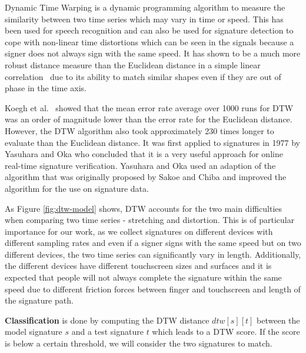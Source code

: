 \documentclass[a4paper, oneside]{csthesis}
\begin{document}
Dynamic Time Warping is a dynamic programming algorithm to measure the similarity between two time series which may vary in time or speed. This has been used for speech recognition and can also be used for signature detection to cope with  non-linear time distortions which can be seen in the signals because a signer does not always sign with the same speed. It has shown to be a much more robust distance measure than the Euclidean distance in a simple linear correlation~\cite{Keogh:2000:SUD:347090.347153, 1030918, 1227706} due to its ability to match similar shapes even if they are out of phase in the time axis.

Koegh et al.~\cite{Keogh:2002:EID:1287369.1287405} showed that the mean error rate average over 1000 runs for DTW was an order of magnitude lower than the error rate for the Euclidean distance. However, the DTW algorithm also took approximately 230 times longer to evaluate than the Euclidean distance.
It was first applied to signatures in 1977 by Yasuhara and Oka \cite{yasuhara1977DTW} who concluded that it is a very useful approach for online real-time signature verification. Yasuhara and Oka used an adaption of the algorithm that was originally proposed by Sakoe and Chiba \cite{1163055} and improved the algorithm for the use on signature data.

As Figure \ref{fig:dtw-model} shows, DTW accounts for the two main difficulties when comparing two time series - stretching and distortion. This is of particular importance for our work, as we collect signatures on different devices with different sampling rates and even if a signer signs with the same speed but on two different devices, the two time series can significantly vary in length. Additionally, the different devices have different touchscreen sizes and surfaces and it is expected that people will not always complete the signature within the same speed due to different friction forces between finger and touchscreen and length of the signature path.



\textbf{Classification} is done by computing the DTW distance $dtw[s][t]$ between the model signature $s$ and a test signature $t$ which leads to a DTW score. If the score is below a certain threshold, we will consider the two signatures to match.
\end{document}
